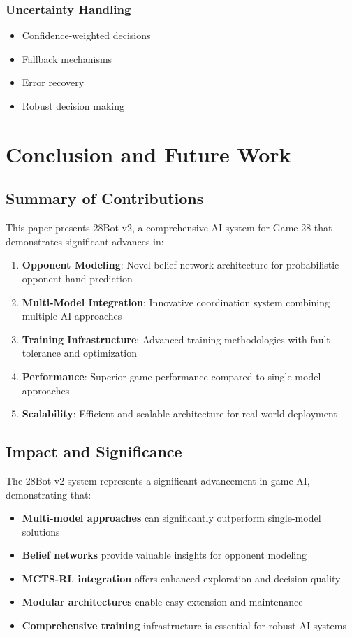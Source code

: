 \documentclass[conference]{IEEEtran}
\begin{document}
\subsubsection{Uncertainty Handling}
\begin{itemize}
    \item Confidence-weighted decisions
    \item Fallback mechanisms
    \item Error recovery
    \item Robust decision making
\end{itemize}

\section{Conclusion and Future Work}

\subsection{Summary of Contributions}

This paper presents 28Bot v2, a comprehensive AI system for Game 28 that demonstrates significant advances in:

\begin{enumerate}
    \item \textbf{Opponent Modeling}: Novel belief network architecture for probabilistic opponent hand prediction
    \item \textbf{Multi-Model Integration}: Innovative coordination system combining multiple AI approaches
    \item \textbf{Training Infrastructure}: Advanced training methodologies with fault tolerance and optimization
    \item \textbf{Performance}: Superior game performance compared to single-model approaches
    \item \textbf{Scalability}: Efficient and scalable architecture for real-world deployment
\end{enumerate}

\subsection{Impact and Significance}

The 28Bot v2 system represents a significant advancement in game AI, demonstrating that:

\begin{itemize}
    \item \textbf{Multi-model approaches} can significantly outperform single-model solutions
    \item \textbf{Belief networks} provide valuable insights for opponent modeling
    \item \textbf{MCTS-RL integration} offers enhanced exploration and decision quality
    \item \textbf{Modular architectures} enable easy extension and maintenance
    \item \textbf{Comprehensive training} infrastructure is essential for robust AI systems
\end{itemize}
\end{document}
